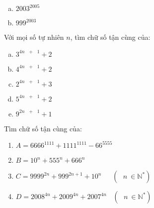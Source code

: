 \begin{bt}
\begin{multicols}{3}
\begin{enumerate}[a)]
\item ${2003}^{2005}$         
\item ${999}^{2003}$
\end{enumerate}
\end{multicols}
\end{bt}   \begin{bt}
Với mọi số tự nhiên $n$, tìm chữ số tận cùng của:
\begin{multicols}{3}
\begin{enumerate}[a)]
\item ${{3}^{4n\text{ }+\text{ }1}}+2$     
\item ${{4}^{4n\text{ }+\text{ }1}}+2$                              
\item ${{2}^{4n\text{ }+\text{ }1}}+3$ 
\item ${{5}^{4n\text{ }+\text{ }1}}+2$                              
\item ${{9}^{2n\text{ }+\text{ }1}}+1$
\end{enumerate}  	
\end{multicols}
\end{bt}   \begin{bt}
Tìm chữ số tận cùng của:
\begin{enumerate}[]
\item $A = {{6666}^{1111}}+{{1111}^{1111}}-{{66}^{5555}}$
\item $B = {{10}^{n}}+{{555}^{n}}+{{666}^{n}}$
\item $C = {{9999}^{2n}}+{{999}^{2n+1}}+{{10}^{n}}~~~~~~~(\text{ }n~\in {{\mathbb{N}}^{*}})$
\item $D ={{2008}^{4n}}+{{2009}^{4n}}+{{2007}^{4n}}~~~~(\text{ }n~\in {{\mathbb{N}}^{*}})$ 
\end{enumerate} 

\end{bt}